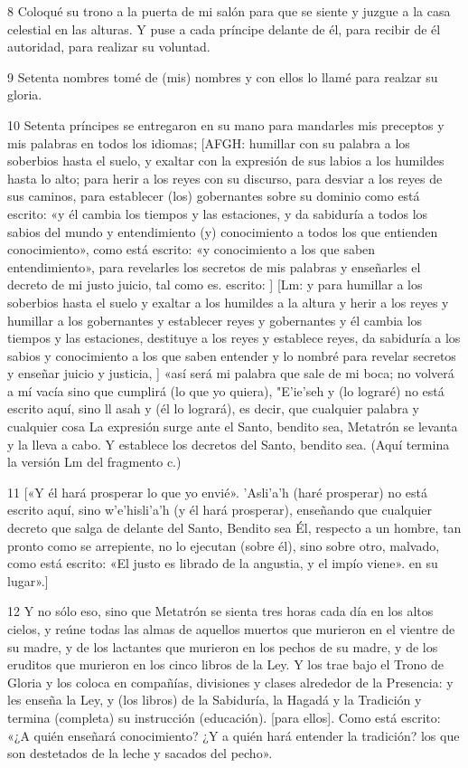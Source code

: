 \par 8 Coloqué su trono a la puerta de mi salón para que se siente y juzgue a la casa celestial en las alturas. Y puse a cada príncipe delante de él, para recibir de él autoridad, para realizar su voluntad.

\par 9 Setenta nombres tomé de (mis) nombres y con ellos lo llamé para realzar su gloria.

\par 10 Setenta príncipes se entregaron en su mano para mandarles mis preceptos y mis palabras en todos los idiomas; [AFGH: humillar con su palabra a los soberbios hasta el suelo, y exaltar con la expresión de sus labios a los humildes hasta lo alto; para herir a los reyes con su discurso, para desviar a los reyes de sus caminos, para establecer (los) gobernantes sobre su dominio como está escrito: «y él cambia los tiempos y las estaciones, y da sabiduría a todos los sabios del mundo y entendimiento (y) conocimiento a todos los que entienden conocimiento», como está escrito: «y conocimiento a los que saben entendimiento», para revelarles los secretos de mis palabras y enseñarles el decreto de mi justo juicio, tal como es. escrito: ] [Lm: y para humillar a los soberbios hasta el suelo y exaltar a los humildes a la altura y herir a los reyes y humillar a los gobernantes y establecer reyes y gobernantes y él cambia los tiempos y las estaciones, destituye a los reyes y establece reyes, da sabiduría a los sabios y conocimiento a los que saben entender y lo nombré para revelar secretos y enseñar juicio y justicia, ] «así será mi palabra que sale de mi boca; no volverá a mí vacía sino que cumplirá (lo que yo quiera), "E'ie'seh y (lo lograré) no está escrito aquí, sino ll asah y (él lo logrará), es decir, que cualquier palabra y cualquier cosa La expresión surge ante el Santo, bendito sea, Metatrón se levanta y la lleva a cabo. Y establece los decretos del Santo, bendito sea. (Aquí termina la versión Lm del fragmento c.)

\par 11 [«Y él hará prosperar lo que yo envié». 'Asli'a'h (haré prosperar) no está escrito aquí, sino w'e'hisli'a'h (y él hará prosperar), enseñando que cualquier decreto que salga de delante del Santo, Bendito sea Él, respecto a un hombre, tan pronto como se arrepiente, no lo ejecutan (sobre él), sino sobre otro, malvado, como está escrito: «El justo es librado de la angustia, y el impío viene». en su lugar».]

\par 12 Y no sólo eso, sino que Metatrón se sienta tres horas cada día en los altos cielos, y reúne todas las almas de aquellos muertos que murieron en el vientre de su madre, y de los lactantes que murieron en los pechos de su madre, y de los eruditos que murieron en los cinco libros de la Ley. Y los trae bajo el Trono de Gloria y los coloca en compañías, divisiones y clases alrededor de la Presencia: y les enseña la Ley, y (los libros) de la Sabiduría, la Hagadá y la Tradición y termina (completa) su instrucción (educación). [para ellos]. Como está escrito: «¿A quién enseñará conocimiento? ¿Y a quién hará entender la tradición? los que son destetados de la leche y sacados del pecho».


